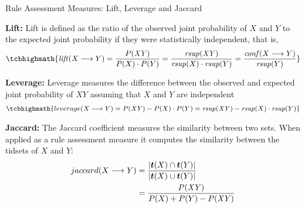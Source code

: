 \begin{frame}{Rule Assessment Measures: Lift, Leverage and Jaccard}

  {\bf Lift:}
Lift 
is def\/{i}ned as the ratio of the observed joint
probability of $X$ and $Y$ to the expected joint probability if they
were statistically independent, that is,
\begin{align*}
\tcbhighmath{
   \lift (X \arule Y) = \frac{P(\mathit{XY})}{P(X) \cdot P(Y)} =
   \frac{\rsupp(\mathit{XY})}{\rsupp(X)\cdot\rsupp(Y)} = \frac{\conff(X\arule
   Y)}{\rsupp(Y)}
}
\end{align*}

\medskip
{\bf Leverage:}
Leverage 
measures the difference between the
observed and expected joint probability of $XY$ assuming that $X$ and
$Y$ are independent
\begin{align*}
\tcbhighmath{
  \leverage (X \arule Y) = P(\mathit{XY}) - P(X) \cdot P(Y) = \rsupp(\mathit{XY}) -
  \rsupp(X) \cdot \rsupp(Y)
}
\end{align*}

{\bf Jaccard:}
The Jaccard coeff\/{i}cient
measures the similarity
between
two sets. When applied as a rule assessment measure it computes the
similarity between the tidsets of $X$ and $Y$:
\begin{align*}
\jaccard (X \arule Y) & =
\frac{\card{\vT(X) \cap \vT(Y)}}{\card{\vT(X) \cup \vT(Y)}}\\
& = \frac{P(\mathit{XY})}{P(X)+P(Y)-P(\mathit{XY})}
\end{align*}


\end{frame}


